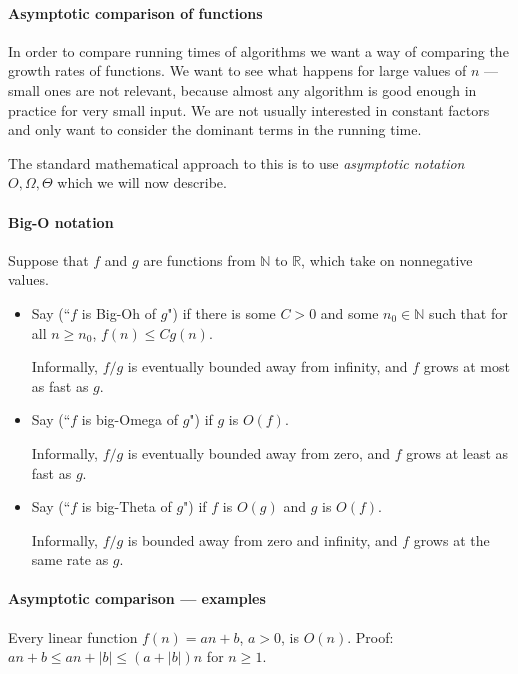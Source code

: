 \paragraph{Asymptotic comparison of functions}
In order to compare running times of algorithms we want a way of comparing
the growth rates of functions. We want to see what happens for large values of $n$ --- small ones are not
 relevant, because almost any algorithm is good enough in practice for very small input. 
 We are not usually interested in constant factors and only want to consider the 
dominant terms in the running time.

The standard mathematical approach to this is to use \emph{asymptotic notation}
$O, \Omega, \Theta$ which we will now describe.

\paragraph{Big-O notation}
\begin{Definition}

Suppose that $f$ and $g$ are functions from $\mathbb{N}$ to $\mathbb{R}$, 
which take on nonnegative values. 
\begin{itemize}
\item Say  (``$f$ is Big-Oh of $g$") if there is
some $C > 0$ and some $n_0 \in \mathbb{N}$ such that for all $n \geq
n_0$, $f(n) \leq C g(n)$. 

Informally, $f/g$ is eventually bounded away from infinity, and $f$ grows at most as fast as $g$.

\item Say  (``$f$ is big-Omega of $g$") if $g$ is
$O(f)$. 

Informally, $f/g$ is eventually bounded away from zero, and $f$ grows at least as fast as $g$.
\item Say  (``$f$ is big-Theta of $g$") if $f$ is 
$O(g)$ and $g$ is $O(f)$. 

Informally, $f/g$ is bounded away from zero and infinity, and $f$ grows at the same rate as $g$.
\end{itemize}
\end{Definition}



\paragraph{Asymptotic comparison --- examples}
\begin{Example}
Every linear function $f(n) = an + b$, $a > 0$, is $O(n)$. Proof: 
$an + b \leq an + |b| \leq (a + |b|) n$ for $n \geq 1$. 
\end{Example}

